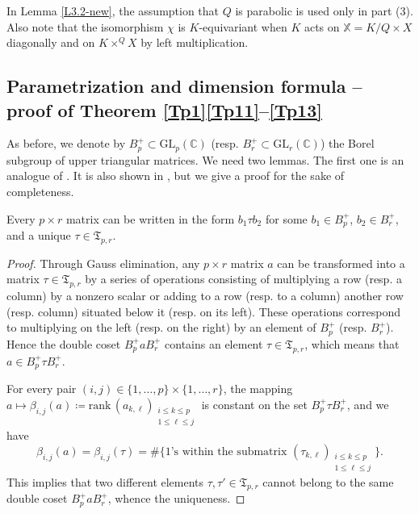\documentclass[ALCO,Unicode]{cedram}
\newcommand{\card}[1]{\# #1}
\newcommand{\rank}{\mathrm{rank}}
\newcommand{\ppermutationsof}{\mathfrak{T}}
\newcommand{\GL}{\mathrm{GL}}
\newcommand{\mC}{\mathbb{C}}
\begin{document}
\begin{rema}
In Lemma \ref{L3.2-new}, the assumption that $Q$ is parabolic is used only in part (3).
Also note that the isomorphism $\chi$ is $K$-equivariant when $K$ acts on $\mathbb{X}=K/Q\times X$ diagonally and on $K\times^Q X$ by left multiplication.
\end{rema}

\subsection{Parametrization and dimension formula -- proof of  Theorem \ref{Tp1}\ref{Tp11}--\ref{Tp13}}\label{section-3.2}


As before, we denote by $B_p^+\subset\GL_p(\mC)$ (resp. $B_r^+\subset\GL_r(\mC)$) the Borel subgroup of upper triangular matrices. We need two lemmas. The first one is an analogue of \cite[Proposition 6.3]{FN2}.
It is also shown in \cite[p.~390]{Fulton-1991}, but we give a proof for the sake of completeness.

\begin{lemma}
\label{L3.2}
Every $p\times r$ matrix can be written in the form
$b_1\tau b_2$
for some $b_1\in B_p^+$, $b_2\in B_r^+$, and a unique $\tau\in\ppermutationsof_{p,r}$.
\end{lemma}

\begin{proof}
Through Gauss elimination, any $p\times r$ matrix $a$ can be
transformed into a matrix $\tau\in\ppermutationsof_{p,r}$ by a
series of operations consisting of multiplying a row (resp. a
column) by a nonzero scalar or adding to a row (resp. to a column)
another row (resp. column) situated below it (resp. on its left).
These operations correspond to multiplying on the left (resp. on
the right) by an element of $B_p^+$ (resp. $B_r^+$). Hence the
double coset $B_p^+aB_r^+$ contains an element
$\tau\in\ppermutationsof_{p,r}$, which means that $a\in
B_p^+ \tau B_r^+$.

For every pair $(i,j)\in\{1,\ldots,p\}\times\{1,\ldots,r\}$, the mapping $a\mapsto \beta_{i,j}(a)\coloneqq \rank\,(a_{k,\ell})_{\substack{i\leq k\leq p\\ 1\leq \ell\leq j}}$
is constant on the set $B_p^+\tau B_r^+$, and we have
\[\beta_{i,j}(a)=\beta_{i,j}(\tau)=\card\{\mbox{$1$'s within the submatrix $(\tau_{k,\ell})_{\substack{i\leq k\leq p\\ 1\leq \ell\leq j}}$}\}.\]
This implies that two different elements $\tau,\tau'\in\ppermutationsof_{p,r}$ cannot belong to the same double coset $B_p^+aB_r^+$, whence the uniqueness.
\end{proof}
\end{document}
